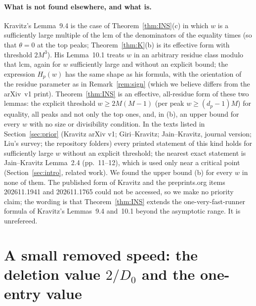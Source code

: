 \documentclass[11pt]{article}
\theoremstyle{definition}
\theoremstyle{remark}
\begin{document}
\paragraph{What is not found elsewhere, and what is.}
Kravitz's Lemma~9.4 is the case of Theorem~\ref{thm:INS}(c) in which $w$ is a sufficiently large multiple of the lcm of the denominators of the equality times (so that $\theta=0$ at the top peaks; Theorem~\ref{thm:K}(b) is its effective form with threshold $2M^3$). His Lemma~10.1 treats $w$ in an arbitrary residue class modulo that lcm, again for $w$ sufficiently large and without an explicit bound; the expression $H_p(w)$ has the same shape as his formula, with the orientation of the residue parameter as in Remark~\ref{rem:sign} (which we believe differs from the arXiv~v1 print). Theorem~\ref{thm:INS} is an effective, all-residue form of these two lemmas: the explicit threshold $w\ge2M(M-1)$ (per peak $w\ge(d_p-1)M$) for equality, all peaks and not only the top ones, and, in (b), an upper bound for every $w$ with no size or divisibility condition. In the texts listed in Section~\ref{sec:prior} (Kravitz arXiv v1; Giri--Kravitz; Jain--Kravitz, journal version; Liu's survey; the repository folders) every printed statement of this kind holds for sufficiently large $w$ without an explicit threshold; the nearest exact statement is Jain--Kravitz Lemma~2.4 (pp.~11--12), which is used only near a critical point (Section~\ref{sec:intro}, related work). We found the upper bound (b) for every $w$ in none of them. The published form of Kravitz and the preprints.org items 202611.1941 and 202611.1765 could not be accessed, so we make no priority claim; the wording is that Theorem~\ref{thm:INS} extends the one-very-fast-runner formula of Kravitz's Lemmas~9.4 and~10.1 beyond the asymptotic range. It is unrefereed.




\section{A small removed speed: the deletion value $2/D_0$ and the one-entry value}\label{sec:del}
\end{document}

